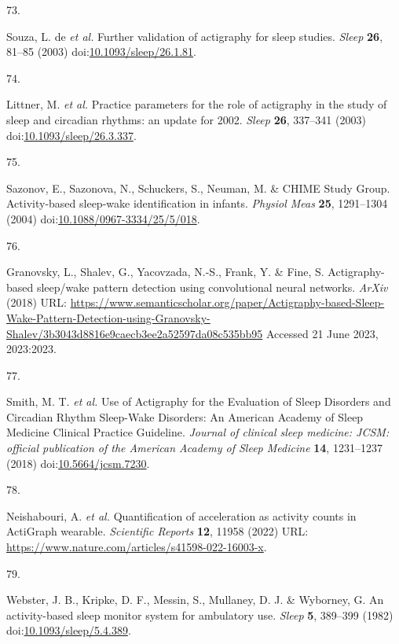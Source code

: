 \documentclass[
  10pt,
]{scrbook}
\newlength{\cslhangindent}
\newlength{\csllabelwidth}
\newlength{\cslentryspacingunit} %
\newenvironment{CSLReferences}[2] %
 {%
  \setlength{\parindent}{0pt}
  \ifodd #1
  \let\oldpar\par
  \def\par{\hangindent=\cslhangindent\oldpar}
  \fi
  \setlength{\parskip}{#2\cslentryspacingunit}
 }%
 {}
\newcommand{\CSLLeftMargin}[1]{\parbox[t]{\csllabelwidth}{#1}}
\newcommand{\CSLRightInline}[1]{\parbox[t]{\linewidth - \csllabelwidth}{#1}\break}
\begin{document}
\begin{CSLReferences}{0}{0}
\leavevmode{}%
\CSLLeftMargin{73. }%
\CSLRightInline{Souza, L. de \emph{et al.} Further validation of
actigraphy for sleep studies. \emph{Sleep} \textbf{26}, 81--85 (2003)
doi:\href{https://doi.org/10.1093/sleep/26.1.81}{10.1093/sleep/26.1.81}.}

\leavevmode{}%
\CSLLeftMargin{74. }%
\CSLRightInline{Littner, M. \emph{et al.} Practice parameters for the
role of actigraphy in the study of sleep and circadian rhythms: an
update for 2002. \emph{Sleep} \textbf{26}, 337--341 (2003)
doi:\href{https://doi.org/10.1093/sleep/26.3.337}{10.1093/sleep/26.3.337}.}

\leavevmode{}%
\CSLLeftMargin{75. }%
\CSLRightInline{Sazonov, E., Sazonova, N., Schuckers, S., Neuman, M. \&
CHIME Study Group. Activity-based sleep-wake identification in infants.
\emph{Physiol Meas} \textbf{25}, 1291--1304 (2004)
doi:\href{https://doi.org/10.1088/0967-3334/25/5/018}{10.1088/0967-3334/25/5/018}.}

\leavevmode{}%
\CSLLeftMargin{76. }%
\CSLRightInline{Granovsky, L., Shalev, G., Yacovzada, N.-S., Frank, Y.
\& Fine, S. Actigraphy-based sleep/wake pattern detection using
convolutional neural networks. \emph{{ArXiv}} (2018) URL:
\url{https://www.semanticscholar.org/paper/Actigraphy-based-Sleep-Wake-Pattern-Detection-using-Granovsky-Shalev/3b3043d8816e9caecb3ee2a52597da08c535bb95}
Accessed 21 June 2023, 2023:2023.}

\leavevmode{}%
\CSLLeftMargin{77. }%
\CSLRightInline{Smith, M. T. \emph{et al.} Use of Actigraphy for the
Evaluation of Sleep Disorders and Circadian Rhythm Sleep-Wake Disorders:
An American Academy of Sleep Medicine Clinical Practice Guideline.
\emph{Journal of clinical sleep medicine: JCSM: official publication of
the American Academy of Sleep Medicine} \textbf{14}, 1231--1237 (2018)
doi:\href{https://doi.org/10.5664/jcsm.7230}{10.5664/jcsm.7230}.}

\leavevmode{}%
\CSLLeftMargin{78. }%
\CSLRightInline{Neishabouri, A. \emph{et al.} Quantification of
acceleration as activity counts in ActiGraph wearable. \emph{Scientific
Reports} \textbf{12}, 11958 (2022) URL:
\url{https://www.nature.com/articles/s41598-022-16003-x}.}

\leavevmode{}%
\CSLLeftMargin{79. }%
\CSLRightInline{Webster, J. B., Kripke, D. F., Messin, S., Mullaney, D.
J. \& Wyborney, G. An activity-based sleep monitor system for ambulatory
use. \emph{Sleep} \textbf{5}, 389--399 (1982)
doi:\href{https://doi.org/10.1093/sleep/5.4.389}{10.1093/sleep/5.4.389}.}


\end{CSLReferences}
\end{document}
